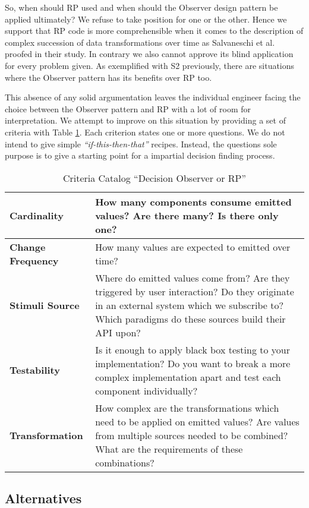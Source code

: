 \documentclass[12pt,a4paper]{article}
\begin{document}
So, when should RP used and when should the Observer design pattern be applied ultimately? We refuse to take position for one or the other. Hence we support that RP code is more comprehensible when it comes to the description of complex succession of data transformations over time as Salvaneschi et al. \cite{7827078} proofed in their study. In contrary we also cannot approve its blind application for every problem given. As exemplified with S2 previously, there are situations where the Observer pattern has its benefits over RP too.

This absence of any solid argumentation leaves the individual engineer facing the choice between the Observer pattern and RP with a lot of room for interpretation. We attempt to improve on this situation by providing a set of criteria with Table \ref{tab:criteria}. Each criterion states one or more questions. We do not intend to give simple \emph{``if-this-then-that''} recipes. Instead, the questions sole purpose is to give a starting point for a impartial decision finding process.

\begin{table}[ht]
	\begin{tabularx}{\textwidth}{ |l|X| }
		\hline
		\textbf{Cardinality}      & How many components consume emitted values? Are there many? Is there only one? \\ \hline
		\textbf{Change Frequency} & How many values are expected to emitted over time?\\ \hline
		\textbf{Stimuli Source}   & Where do emitted values come from? Are they triggered by user interaction? Do they originate in an external system which we subscribe to? Which paradigms do these sources build their API upon? \\ \hline
		\textbf{Testability}      & Is it enough to apply black box testing to your implementation? Do you want to break a more complex implementation apart and test each component individually? \\ \hline
		\textbf{Transformation}   & How complex are the transformations which need to be applied on emitted values? Are values from multiple sources needed to be combined? What are the requirements of these combinations?\\ \hline
	\end{tabularx}
	\caption{Criteria Catalog ``Decision Observer or RP''}
	\label{tab:criteria}
\end{table}


\subsection{Alternatives}
\end{document}
